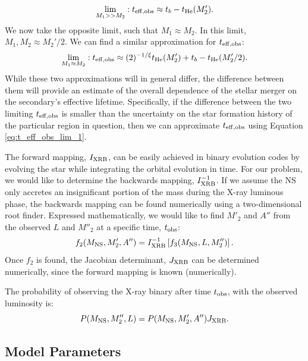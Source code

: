 \documentclass[12pt, preprint]{aastex}
\begin{document}
\begin{equation}
\lim_{M_1 >> M_2}:  t_{\rm eff,obs} \approx t_b - t_{\rm He}(M_2'). \label{eq:t_eff_obs_lim_1}
\end{equation}
We now take the opposite limit, such that $M_1 \approx M_2$. In this limit, $M_1, M_2 \approx M_2'/2$. We can find a similar approximation for $t_{\rm eff,obs}$:
\begin{equation}
\lim_{M_1 \approx M_2}: t_{\rm eff,obs} \approx (2)^{-1/\xi}  t_{\rm He} (M_2') + t_b - t_{\rm He} (M_2'/2).
\end{equation}
While these two approximations will in general differ, the difference between them will provide an estimate of the overall dependence of the stellar merger on the secondary's effective lifetime. Specifically, if the difference between the two limiting $t_{\rm eff,obs}$ is smaller than the uncertainty on the star formation history of the particular region in question, then we can approximate $t_{\rm eff,obs}$ using Equation \ref{eq:t_eff_obs_lim_1}.


The forward mapping, $I_{\rm XRB}$, can be easily achieved in binary evolution codes by evolving the star while integrating the orbital evolution in time. For our problem, we would like to determine the backwards mapping, $I^{-1}_{\rm XRB}$. If we assume the NS only accretes an insignificant portion of the mass during the X-ray luminous phase, the backwards mapping can be found numerically using a two-dimensional root finder. Expressed mathematically, we would like to find $M'_2$ and $A''$ from the observed $L$ and $M''_2$ at a specific time, $t_{\rm obs}$:
\begin{equation}
f_2(M_{\rm NS}, M'_2, A'') = I^{-1}_{\rm XRB} \left[ f_3(M_{\rm NS}, L, M''_2) \right].
\end{equation}
Once $f_2$ is found, the Jacobian determinant, $J_{\rm XRB}$ can be determined numerically, since the forward mapping is known (numerically).

The probability of observing the X-ray binary after time $t_{\rm obs}$, with the observed luminosity is:
\begin{equation}
P(M_{\rm NS}, M''_2, L) = P(M_{\rm NS}, M'_2, A'') J_{\rm XRB}. \label{eq:P_XRB}
\end{equation}



\subsection{Model Parameters}
\end{document}
